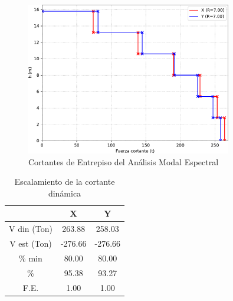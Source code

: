 \documentclass{article}%
\begin{document}
\begin{figure}[ht!]%
\includegraphics[width=0.8\textwidth]{images/cortantes}%
\caption{Cortantes de Entrepiso del Análisis Modal Espectral}%
\label{fig:corte_basal}%
\end{figure}

%


\begin{table}[H]%
\centering%
\caption{Escalamiento de la cortante dinámica}%
\begin{tabular}{ccc}
\toprule
 & X & Y \\
\midrule
V din (Ton) & 263.88 & 258.03 \\
V est (Ton) & -276.66 & -276.66 \\
\% min & 80.00 & 80.00 \\
\% & 95.38 & 93.27 \\
F.E. & 1.00 & 1.00 \\
\bottomrule
\end{tabular}
%
\end{table}

%
\end{document}
